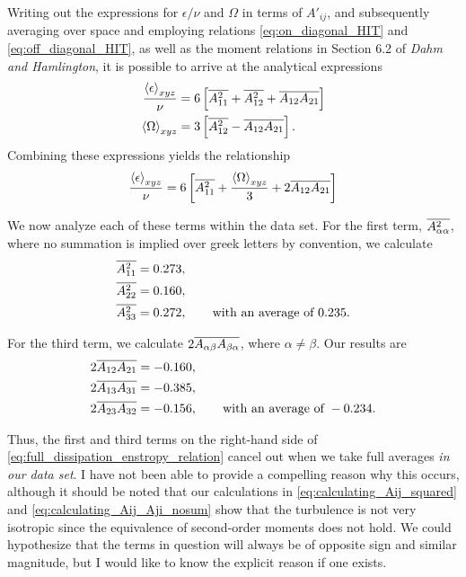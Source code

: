 \documentclass[11pt]{article}
\begin{document}
Writing out the expressions for $\epsilon/\nu$ and $\Omega$ in terms of $A'_{ij}$, and subsequently averaging over space and employing relations \eqref{eq:on_diagonal_HIT} and \eqref{eq:off_diagonal_HIT}, as well as the moment relations in Section 6.2 of \textit{Dahm and Hamlington}, it is possible to arrive at the analytical expressions
\begin{align}
\frac{\left< \epsilon \right>_{xyz}}{\nu} &=
6 \left[ \overline{A^2_{11}} + \overline{A^2_{12}} + \overline{A_{12} A_{21}} \right]
\\
\left< \Omega \right>_{xyz} &=
3 \left[ \overline{A^2_{12}} - \overline{A_{12} A_{21}} \right]
.
\end{align}
Combining these expressions yields the relationship
\begin{equation}
\frac{\left< \epsilon \right>_{xyz}}{\nu}
=
6 \left[ \overline{A^2_{11}} + \frac{\left< \Omega \right>_{xyz}}{3} + 2 \overline{A_{12} A_{21}} \right]
\label{eq:full_dissipation_enstropy_relation}
\end{equation}

We now analyze each of these terms within the data set. For the first term, $\overline{A^2_{\alpha\alpha}}$, where no summation is implied over greek letters by convention, we calculate
\begin{align}
\overline{A^2_{11}} &= 0.273, \notag \\
\overline{A^2_{22}} &= 0.160, \notag \\
\overline{A^2_{33}} &= 0.272, \qquad
\text{with an average of } 0.235.
\label{eq:calculating_Aij_squared}
\end{align}

For the third term, we calculate $2\overline{A_{\alpha\beta}A_{\beta\alpha}}$, where $\alpha \neq \beta$. Our results are
\begin{align}
2\overline{A_{12} A_{21}} &= -0.160, \notag \\
2\overline{A_{13} A_{31}} &= -0.385, \notag \\
2\overline{A_{23} A_{32}} &= -0.156, \qquad
\text{with an average of } -0.234.
\label{eq:calculating_Aij_Aji_nosum}
\end{align}

Thus, the first and third terms on the right-hand side of \eqref{eq:full_dissipation_enstropy_relation} cancel out when we take full averages \emph{in our data set}. I have not been able to provide a compelling reason why this occurs, although it should be noted that our calculations in \eqref{eq:calculating_Aij_squared} and \eqref{eq:calculating_Aij_Aji_nosum} show that the turbulence is not very isotropic since the equivalence of second-order moments does not hold. We could hypothesize that the terms in question will always be of opposite sign and similar magnitude, but I would like to know the explicit reason if one exists.
\end{document}

